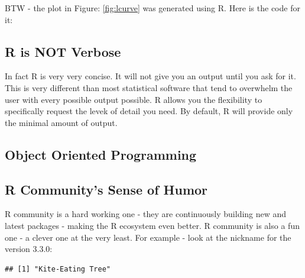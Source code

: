 \documentclass[10pt, letterpaper, twoside]{memoir}\usepackage{knitr}
\begin{document}
BTW - the plot in Figure: \ref{fig:lcurve} was generated using R. Here is the code for it:
\begin{knitrout}
\color{fgcolor}\begin{kframe}
\begin{alltt}
\hlopt{^}\hlstd{,}  \hlstd{=} \hlstd{,}  \hlstd{=} \hlstd{,}  \hlstd{=} \hlstd{,}  \hlstd{=} \hlstd{,}  \hlstd{=} \hlstd{,}
     \hlstd{=} \hlstd{,}  \hlstd{=} \hlstd{,}  \hlstd{=} \hlstd{)}
\hlstd{(} \hlstd{=} \hlstd{,}  \hlstd{=} \hlstd{,}  \hlstd{=} \hlstd{,}  \hlstd{=} \hlstd{)}
\end{alltt}
\end{kframe}
\end{knitrout}

\subsection{R is NOT Verbose}

In fact R is very very concise. It will not give you an output until you ask for it. This is very different than most statistical software that tend to overwhelm the user with every possible output possible. R allows you the flexibility to specifically request the levek of detail you need. By default, R will provide only the minimal amount of output.

\subsection{Object Oriented Programming}

\subsection{R Community's Sense of Humor}

R community is a hard working one - they are continuously building new and latest packages - making the R ecosystem even better. R community is also a fun one - a clever one at the very least. For example - look at the nickname for the version 3.3.0:
\begin{knitrout}
\color{fgcolor}\begin{kframe}
\begin{alltt}
\hlopt{$}
\end{alltt}
\begin{verbatim}
## [1] "Kite-Eating Tree"
\end{verbatim}
\end{kframe}
\end{knitrout}
\end{document}
